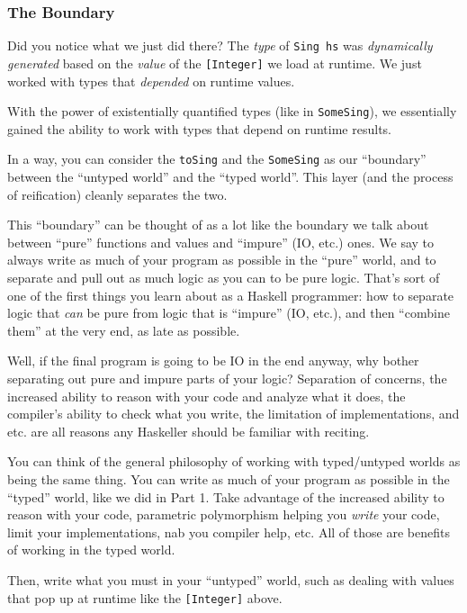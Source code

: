 \documentclass[]{article}
\begin{document}
\subsubsection{The Boundary}\label{the-boundary}

Did you notice what we just did there? The \emph{type} of \texttt{Sing\ hs} was
\emph{dynamically generated} based on the \emph{value} of the
\texttt{{[}Integer{]}} we load at runtime. We just worked with types that
\emph{depended} on runtime values.

With the power of existentially quantified types (like in \texttt{SomeSing}), we
essentially gained the ability to work with types that depend on runtime
results.

In a way, you can consider the \texttt{toSing} and the \texttt{SomeSing} as our
``boundary'' between the ``untyped world'' and the ``typed world''. This layer
(and the process of reification) cleanly separates the two.

This ``boundary'' can be thought of as a lot like the boundary we talk about
between ``pure'' functions and values and ``impure'' (IO, etc.) ones. We say to
always write as much of your program as possible in the ``pure'' world, and to
separate and pull out as much logic as you can to be pure logic. That's sort of
one of the first things you learn about as a Haskell programmer: how to separate
logic that \emph{can} be pure from logic that is ``impure'' (IO, etc.), and then
``combine them'' at the very end, as late as possible.

Well, if the final program is going to be IO in the end anyway, why bother
separating out pure and impure parts of your logic? Separation of concerns, the
increased ability to reason with your code and analyze what it does, the
compiler's ability to check what you write, the limitation of implementations,
and etc. are all reasons any Haskeller should be familiar with reciting.

You can think of the general philosophy of working with typed/untyped worlds as
being the same thing. You can write as much of your program as possible in the
``typed'' world, like we did in Part 1. Take advantage of the increased ability
to reason with your code, parametric polymorphism helping you \emph{write} your
code, limit your implementations, nab you compiler help, etc. All of those are
benefits of working in the typed world.

Then, write what you must in your ``untyped'' world, such as dealing with values
that pop up at runtime like the \texttt{{[}Integer{]}} above.
\end{document}
